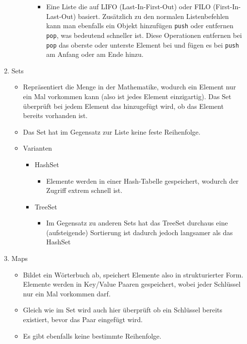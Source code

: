 \documentclass{article}
\begin{document}
\begin{enumerate}
\begin{itemize}
\begin{itemize}
				\begin{itemize}
					\item{Eine Liste die auf LIFO (Last-In-First-Out) oder FILO (First-In-Last-Out) basiert. Zusätzlich zu den normalen Listenbefehlen kann man ebenfalls ein Objekt hinzufügen \verb|push| oder entfernen \verb|pop|, was bedeutend schneller ist. Diese Operationen entfernen bei \verb|pop| das oberste oder unterste Element bei und fügen es bei \verb|push| am Anfang oder am Ende hinzu.}
				\end{itemize}
			\end{itemize}
		\end{itemize}
		\item{Sets}
		\begin{itemize}
			\item{Repräsentiert die Menge in der Mathematike, wodurch ein Element nur ein Mal vorkommen kann (also ist jedes Element einzigartig). Das Set überprüft bei jedem Element das hinzugefügt wird, ob das Element bereits vorhanden ist.}
			\item{Das Set hat im Gegensatz zur Liste keine feste Reihenfolge.}
			\item{Varianten}
			\begin{itemize}
				\item{HashSet}
				\begin{itemize}
					\item{Elemente werden in einer Hash-Tabelle gespeichert, wodurch der Zugriff extrem schnell ist.}
				\end{itemize}
				\item{TreeSet}
				\begin{itemize}
					\item{Im Gegensatz zu anderen Sets hat das TreeSet durchaus eine (aufsteigende) Sortierung ist dadurch jedoch langsamer als das HashSet}
				\end{itemize}
			\end{itemize}
		\end{itemize}
		\item{Maps}
		\begin{itemize}
			\item{Bildet ein Wörterbuch ab, speichert Elemente also in strukturierter Form. Elemente werden in Key/Value Paaren gespeichert, wobei jeder Schlüssel nur ein Mal vorkommen darf.}
			\item{Gleich wie im Set wird auch hier überprüft ob ein Schlüssel bereits existiert, bevor das Paar eingefügt wird.}
			\item{Es gibt ebenfalls keine bestimmte Reihenfolge.}

\end{itemize}
\end{enumerate}
\end{document}
